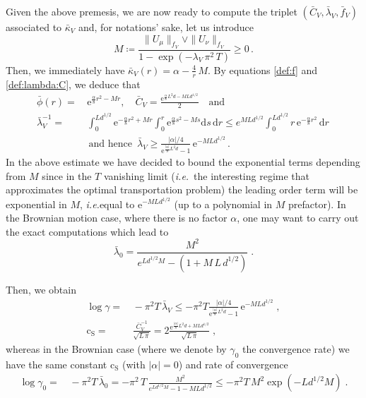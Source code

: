 \documentclass[final,12pt]{colt2023} %
\def\ie{\textit{i.e.}}
\newcommand{\bes}{\begin{equation}}
\newcommand{\ees}{\end{equation}}
\newcommand{\De}{\mathrm{d}}
\newcommand{\rme}{\mathrm{e}}
\def\ie{\textit{i.e.}}
\def\eqsp{\;}
\def\cconst{\mathrm{c}_{\mathrm{S}}}
\def\blambda{\bar{\lambda}}
\def\blambdaV{\blambda_V}
\begin{document}
Given the above premesis, we are now ready to compute the triplet $(\bar{C}_V, \blambdaV, \bar f_V)$ associated to $\bar{\kappa}_V$
and, for notations' sake, let us introduce 
\bes 
M\coloneqq \frac{ \|U_{\mu}\|_{f_V}\vee\|U_{\nu}\|_{f_V}}{1-\exp(-\lambda_V \,\pi^2\,T)}\geq 0\,.
\ees
Then, we immediately have $\bar{\kappa}_V(r)=\alpha-\frac4r\,M$.
By equations \eqref{def:f} and \eqref{def:lambda:C}, we deduce that
\bes
\begin{aligned}
\bar\phi(r)=&\,\rme^{\frac{\alpha}{8}r^2-Mr},\quad  \bar{C}_V=\frac{\rme^{\frac{\alpha}{8}L^2d-M Ld^{1/2}}}{2}\quad\text{and}\\
\blambdaV^{-1}=&\,\int_0^{Ld^{1/2}}\rme^{-\frac{\alpha}{8}r^2+Mr}\int_0^r \rme^{\frac{\alpha}{8}s^2-Ms}\De s\,\De r\leq e^{MLd^{1/2}}\int_0^{Ld^{1/2}}r\,\rme^{-\frac{\alpha}{8}r^2}\,\De r\,\\
\,&\text{ and hence }\,\blambdaV\geq \frac{|\alpha|/4}{\rme^{\frac{|\alpha|}{8}L^2d}-1}\,\rme^{-MLd^{1/2}}\,.
\end{aligned}
\ees
In the above estimate we have decided to bound the exponential terms depending from $M$ since in the $T$ vanishing limit (\ie\, the interesting regime that approximates the optimal transportation problem) the leading order term will be exponential in $M$, \ie equal to $\rme^{-MLd^{1/2}}$ (up to a polynomial in $M$ prefactor). In the Brownian motion case, where there is no factor $\alpha$, one may want to carry out the exact computations which lead to
\bes
\bar\lambda_0=\frac{M^2}{e^{Ld^{1/2}M}-(1+M\,L \,d^{1/2})}\eqsp.
\ees

\medskip

Then, we obtain 
\bes
\begin{split}
\log\gamma=&\,-\pi^2 T\,\blambdaV \leq  -\pi^2 T\frac{|\alpha|/4}{\rme^{\frac{|\alpha|}{8}L^2d}-1}\,\rme^{-MLd^{1/2}}\eqsp, \label{eq:log_gamma_and_c}\\
\cconst=&\,\frac{\bar{C}_V^{-1} }{\sqrt{L \,\pi}}=2\frac{\rme^{\frac{|\alpha|}{8}L^2d+M Ld^{1/2}}}{\sqrt{L\,\pi}}\eqsp,
\end{split}
\ees
whereas in the Brownian case (where we denote by $\gamma_0$ the convergence rate) we have the same constant $\cconst$ (with $|\alpha|=0$) and rate of convergence
\bes
\begin{split}
\log\gamma_0=&\,-\pi^2 T\,\bar\lambda_0 =-\pi^2\,T\,\frac{M^2}{e^{Ld^{1/2}M}-1-MLd^{1/2}}\leq -\pi^2T\,M^2\exp(-Ld^{1/2}M)\eqsp.
\end{split}
\ees
\end{document}
